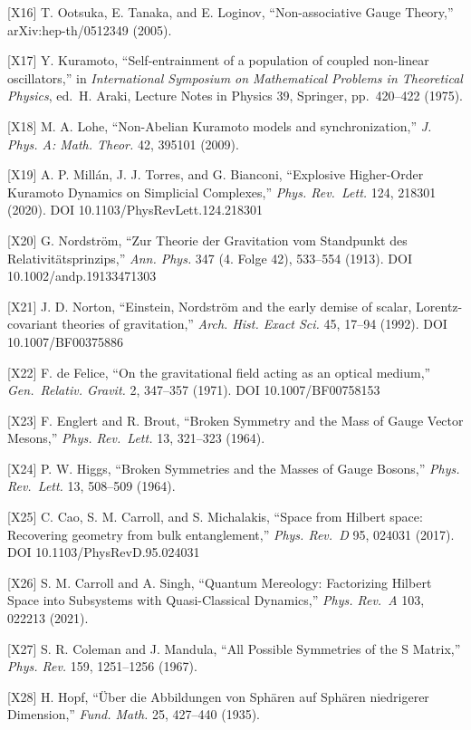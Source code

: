 \documentclass[
  a4paper,
]{article}
\begin{document}
{[}X16{]} T. Ootsuka, E. Tanaka, and E. Loginov, ``Non-associative Gauge
Theory,'' arXiv:hep-th/0512349 (2005).

{[}X17{]} Y. Kuramoto, ``Self-entrainment of a population of coupled
non-linear oscillators,'' in \emph{International Symposium on
Mathematical Problems in Theoretical Physics}, ed.~H. Araki, Lecture
Notes in Physics 39, Springer, pp.~420--422 (1975).

{[}X18{]} M. A. Lohe, ``Non-Abelian Kuramoto models and
synchronization,'' \emph{J. Phys. A: Math. Theor.} 42, 395101 (2009).

{[}X19{]} A. P. Millán, J. J. Torres, and G. Bianconi, ``Explosive
Higher-Order Kuramoto Dynamics on Simplicial Complexes,'' \emph{Phys.
Rev.~Lett.} 124, 218301 (2020). DOI 10.1103/PhysRevLett.124.218301

{[}X20{]} G. Nordström, ``Zur Theorie der Gravitation vom Standpunkt des
Relativitätsprinzips,'' \emph{Ann. Phys.} 347 (4. Folge 42), 533--554
(1913). DOI 10.1002/andp.19133471303

{[}X21{]} J. D. Norton, ``Einstein, Nordström and the early demise of
scalar, Lorentz-covariant theories of gravitation,'' \emph{Arch. Hist.
Exact Sci.} 45, 17--94 (1992). DOI 10.1007/BF00375886

{[}X22{]} F. de Felice, ``On the gravitational field acting as an
optical medium,'' \emph{Gen.~Relativ. Gravit.} 2, 347--357 (1971). DOI
10.1007/BF00758153

{[}X23{]} F. Englert and R. Brout, ``Broken Symmetry and the Mass of
Gauge Vector Mesons,'' \emph{Phys. Rev.~Lett.} 13, 321--323 (1964).

{[}X24{]} P. W. Higgs, ``Broken Symmetries and the Masses of Gauge
Bosons,'' \emph{Phys. Rev.~Lett.} 13, 508--509 (1964).

{[}X25{]} C. Cao, S. M. Carroll, and S. Michalakis, ``Space from Hilbert
space: Recovering geometry from bulk entanglement,'' \emph{Phys. Rev.~D}
95, 024031 (2017). DOI 10.1103/PhysRevD.95.024031

{[}X26{]} S. M. Carroll and A. Singh, ``Quantum Mereology: Factorizing
Hilbert Space into Subsystems with Quasi-Classical Dynamics,''
\emph{Phys. Rev.~A} 103, 022213 (2021).

{[}X27{]} S. R. Coleman and J. Mandula, ``All Possible Symmetries of the
S Matrix,'' \emph{Phys. Rev.} 159, 1251--1256 (1967).

{[}X28{]} H. Hopf, ``Über die Abbildungen von Sphären auf Sphären
niedrigerer Dimension,'' \emph{Fund. Math.} 25, 427--440 (1935).
\end{document}
